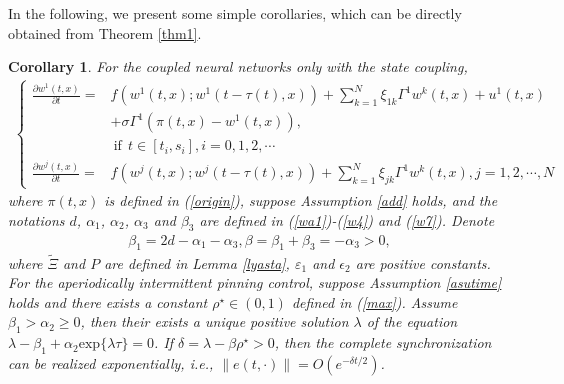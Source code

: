 \documentclass[review]{elsarticle}
\newtheorem{col}{Corollary}
\begin{document}
In the following, we present some simple corollaries, which can be directly obtained from Theorem \ref{thm1}.
\begin{col}
For the coupled neural networks only with the state coupling,
\begin{align*}
\left\{
\begin{array}{cl}
\frac{\partial{w^1(t,x)}}{\partial{t}}=&f(w^1(t,x);w^1(t-\tau(t),x))+\sum\limits_{k=1}^N\xi_{1k}\Gamma^1
w^k(t,x)+u^1(t,x)\\
&+\sigma\Gamma^1 (\pi(t,x)-w^1(t,x)),\\
&~\mathrm{if}~~t\in [t_i,s_i], i=0,1,2,\cdots\\
\frac{\partial{w^j(t,x)}}{\partial{t}}=&f(w^j(t,x);w^j(t-\tau(t),x))+\sum\limits_{k=1}^N\xi_{jk}\Gamma^1
w^k(t,x), j=1,2,\cdots,N
\end{array}
\right.
\end{align*}
where $\pi(t,x)$ is defined in (\ref{origin}), suppose Assumption \ref{add} holds, and the notations $d$, $\alpha_1$, $\alpha_2$, $\alpha_3$ and $\beta_3$ are defined in (\ref{wa1})-(\ref{w4}) and (\ref{w7}). Denote
\begin{align*}
\beta_1=2d-\alpha_1-\alpha_3, \beta=\beta_1+\beta_3=-\alpha_3>0,
\end{align*}
where $\tilde{\Xi}$ and $P$ are defined in Lemma \ref{lyasta}, $\varepsilon_1$ and $\epsilon_2$ are positive constants. For the aperiodically intermittent pinning control, suppose Assumption \ref{asutime} holds and there exists a constant $\rho^{\star}\in (0,1)$ defined in (\ref{max}). Assume $\beta_1>\alpha_2\geq 0$, then their exists a unique positive solution $\lambda$ of the equation
$\lambda-\beta_1+\alpha_2 \mathrm{exp}\{\lambda{\tau}\}=0$.
If $\delta=\lambda-\beta\rho^{\star}>0$, then the complete synchronization can be realized exponentially, i.e., $\|e(t,\cdot)\|=O(e^{-\delta t/2})$.
\end{col}
\end{document}
